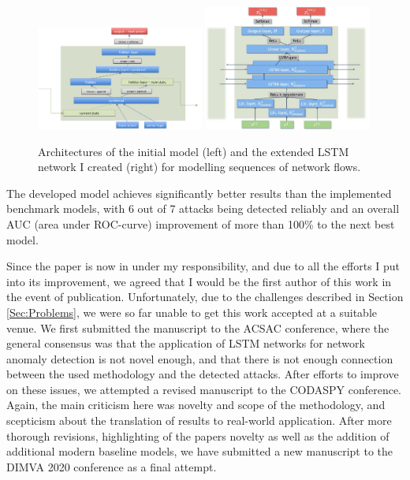 \documentclass[a4paper,12pt,twoside]{article}
\begin{document}
\begin{figure}
\centering

\includegraphics[width=0.49\textwidth]{images/rnn_FSA.png}
\includegraphics[width=0.49\textwidth]{images/LSTM_design_bi2.jpg}
\caption{Architectures of the initial model (left) and the extended
LSTM network I created (right) for modelling sequences of network flows.}
\label{fig:LSTM}
\end{figure}

The developed model achieves significantly better results than the implemented benchmark models, with 6 out of 7 attacks being detected reliably and an overall AUC (area under ROC-curve) improvement of more than 100\% to the next best model.

Since the paper is now in under my responsibility, and due to all the efforts I put into its improvement, we agreed that I would be the first author of this work in the event of publication. Unfortunately, due to the challenges described in Section \ref{Sec:Problems}, we were so far unable to get this work accepted at a suitable venue. We first submitted the manuscript to the ACSAC conference, where the general consensus was that the application of LSTM networks for network anomaly detection is not novel enough, and that there is not enough connection between the used methodology and the detected attacks.
After efforts to improve on these issues, we attempted a revised manuscript to the CODASPY conference. Again, the main criticism here was novelty and scope of the methodology, and scepticism about the translation of results to real-world application. After more thorough revisions, highlighting of the papers novelty as well as the addition of additional modern baseline models, we have submitted a new manuscript to the DIMVA 2020 conference as a final attempt. 
\end{document}
